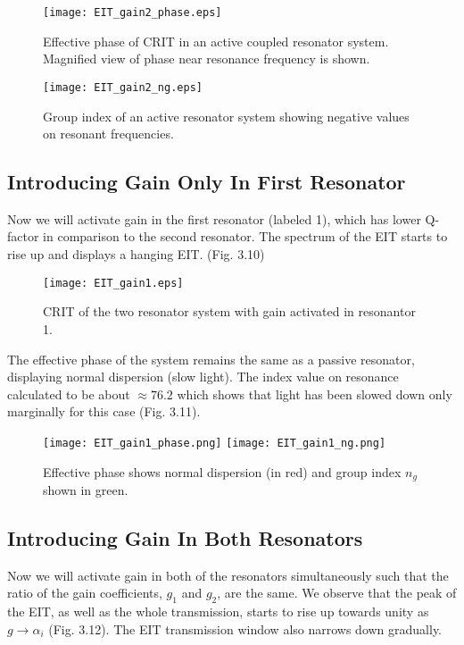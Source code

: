 \begin{figure}[h]
\centering
\texttt{[image: EIT\_gain2\_phase.eps]}
\caption{Effective phase of CRIT in an active coupled resonator system. Magnified view of phase near resonance frequency is shown.}
\end{figure}

     
\begin{figure}[h]
\centering
\texttt{[image: EIT\_gain2\_ng.eps]}
\caption{Group index of an active resonator system showing negative values on resonant frequencies.}
\end{figure}


\subsection{Introducing Gain Only In First Resonator}
Now we will activate gain in the first resonator (labeled 1), which has lower Q-factor in comparison to the second resonator. The spectrum of the EIT starts to rise up and displays a hanging EIT. (Fig. 3.10)

\begin{figure}[h]
\centering
\texttt{[image: EIT\_gain1.eps]}
\caption{CRIT of the two resonator system with gain activated in resonantor 1.}
\end{figure}

The effective phase of the system remains the same as a passive resonator, displaying normal dispersion (slow light). The index value on resonance calculated to be about $\approx 76.2$ which shows that light has been slowed down only marginally for this case (Fig. 3.11). 

\begin{figure}[h]
\texttt{[image: EIT\_gain1\_phase.png]}
\texttt{[image: EIT\_gain1\_ng.png]}
\caption{Effective phase shows normal dispersion (in red) and group index $n_{g}$ shown in green.}
\end{figure}


\subsection{Introducing Gain In Both Resonators}
Now we will activate gain in both of the resonators simultaneously such that the ratio of the gain coefficients, $g_{1}$ and $g_{2}$, are the same. We observe that the peak of the EIT, as well as the whole transmission, starts to rise up towards unity as $g \to \alpha_{i}$ (Fig. 3.12). The EIT transmission window also narrows down gradually.

